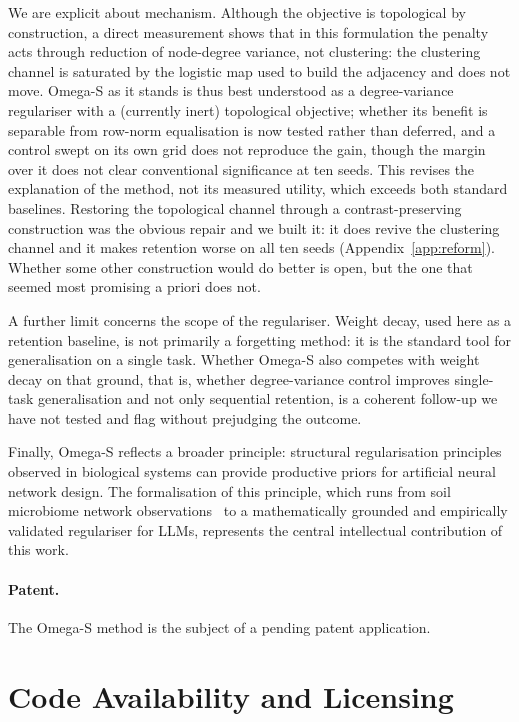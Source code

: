 \documentclass[11pt,a4paper]{article}
\begin{document}
We are explicit about mechanism. Although the objective is topological by
construction, a direct measurement shows that in this formulation the
penalty acts through reduction of node-degree variance, not clustering: the
clustering channel is saturated by the logistic map used to build the
adjacency and does not move. Omega-S as it stands is thus best understood as
a degree-variance regulariser with a (currently inert) topological
objective; whether its benefit is separable from row-norm equalisation is now
tested rather than deferred, and a control swept on its own grid does not
reproduce the gain, though the margin over it does not clear conventional
significance at ten seeds. This revises the explanation
of the method, not its measured utility, which exceeds both standard
baselines. Restoring the topological channel through a contrast-preserving
construction was the obvious repair and we built it: it does revive the
clustering channel and it makes retention worse on all ten seeds
(Appendix~\ref{app:reform}). Whether some other construction would do better is
open, but the one that seemed most promising a priori does not.

A further limit concerns the scope of the regulariser. Weight decay,
used here as a retention baseline, is not primarily a forgetting method: it
is the standard tool for generalisation on a single task. Whether Omega-S
also competes with weight decay on that ground, that is, whether
degree-variance control improves single-task generalisation and not only
sequential retention, is a coherent follow-up we have not tested and flag
without prejudging the outcome.

Finally, Omega-S reflects a broader principle: structural regularisation
principles observed in biological systems can provide productive priors for
artificial neural network design. The formalisation of this principle, which runs from soil microbiome
network observations~\cite{ortiz2021,saati2026} to a mathematically
grounded and empirically validated regulariser for LLMs, represents the
central intellectual contribution of this work.

\paragraph{Patent.} The Omega-S method is the subject of a pending patent
application.

\section*{Code Availability and Licensing}
\end{document}
